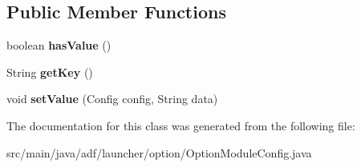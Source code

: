 \subsection*{Public Member Functions}
\begin{DoxyCompactItemize}
\item 
\hypertarget{classadf_1_1launcher_1_1option_1_1OptionModuleConfig_ac696a4a43153d93af5bbe8312fba5e45}{}\label{classadf_1_1launcher_1_1option_1_1OptionModuleConfig_ac696a4a43153d93af5bbe8312fba5e45} 
boolean {\bfseries has\+Value} ()
\item 
\hypertarget{classadf_1_1launcher_1_1option_1_1OptionModuleConfig_a421cca732c2a3828916610e7a14a66f0}{}\label{classadf_1_1launcher_1_1option_1_1OptionModuleConfig_a421cca732c2a3828916610e7a14a66f0} 
String {\bfseries get\+Key} ()
\item 
\hypertarget{classadf_1_1launcher_1_1option_1_1OptionModuleConfig_a1fbd650a37912f7dddb8b99e616113e9}{}\label{classadf_1_1launcher_1_1option_1_1OptionModuleConfig_a1fbd650a37912f7dddb8b99e616113e9} 
void {\bfseries set\+Value} (Config config, String data)
\end{DoxyCompactItemize}


The documentation for this class was generated from the following file\+:\begin{DoxyCompactItemize}
\item 
src/main/java/adf/launcher/option/Option\+Module\+Config.\+java\end{DoxyCompactItemize}
